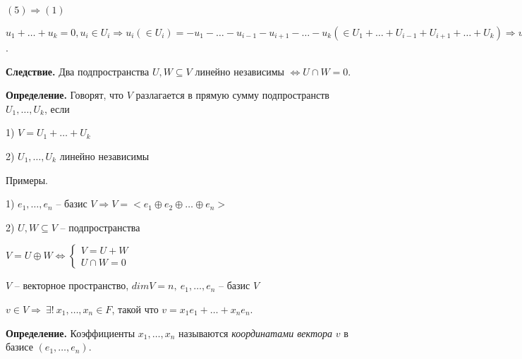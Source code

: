\vspace{\baselineskip}
$(5) \Rightarrow (1)$

$u_1 + \dots + u_k = 0, u_i \in U_i \Rightarrow u_i (\in U_i) = -u_1 - \dots - u_{i-1} - u_{i+1} - \dots - u_k (\in U_1 + \dots + U_{i-1} + U_{i + 1} + \dots + U_k) \Rightarrow u_i \in U_i \cap (U_1 + \dots + U_{i-1} + U_{i+1} + \dots + U_k) \lhd$.

\vspace{\baselineskip}
\textbf{Следствие.} Два подпространства $U, W \subseteq V$ линейно независимы $\Leftrightarrow U \cap W = 0$.

\vspace{\baselineskip}
\textbf{Определение.} Говорят, что $V$ разлагается в прямую сумму подпространств $U_1, \dots, U_k$, если 

1) $V = U_1 + \dots + U_k$  

2) $U_1, \dots, U_k$ линейно независимы

\vspace{\baselineskip}
Примеры. 

1) $e_1, \dots, e_n$ -- базис $V \Rightarrow V = <e_1 \oplus e_2 \oplus \dots \oplus e_n>$ 

2) $U, W \subseteq V$ -- подпространства

$V = U \oplus W \Leftrightarrow \begin{cases} V = U + W \\
U \cap W = 0 \end{cases}$

\vspace{\baselineskip}
$V$ -- векторное пространство, $dimV = n, \ e_1, \dots, e_n$ -- базис $V$

$v \in V \Rightarrow \ \exists ! \ x_1, \dots, x_n \in F$, такой что $v = x_1 e_1 + \dots + x_n e_n$.

\vspace{\baselineskip}
\textbf{Определение.} Коэффициенты $x_1, \dots, x_n$ называются \textit{координатами вектора} $v$ в базисе $(e_1, \dots, e_n)$.

